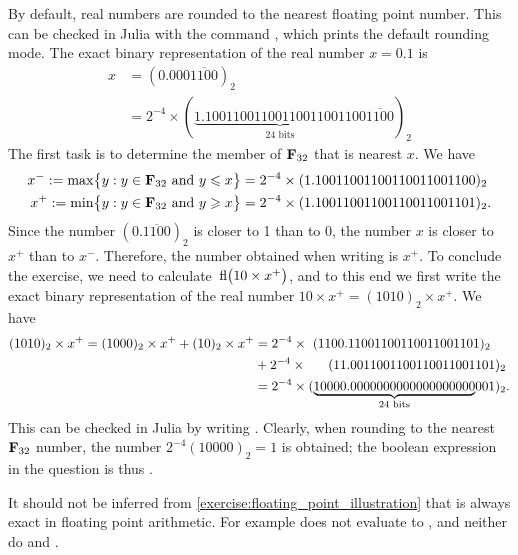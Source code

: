 \begin{solution}
    By default, real numbers are rounded to the nearest floating point number.
    This can be checked in Julia with the command ,
    which prints the default rounding mode.
    The exact binary representation of the real number $x = 0.1$ is
    \begin{align*}
        x
        &= (0.000\overline{1100})_2 \\
        &= 2^{-4} \times (\underbrace{1.10011001100110011001100}_{\text{24 bits}}\overline{1100})_2
    \end{align*}
    The first task is to determine the member of $\mathbf F_{32}$ that is nearest $x$.
    We have
    \begin{align*}
        x^- := \max \bigl\{y: y \in \mathbf F_{32} \text{ and } y \leqslant x\bigr\} &= 2^{-4} \times (1.10011001100110011001100)_2 \\
        x^+ := \min \bigl\{y: y \in \mathbf F_{32} \text{ and } y \geqslant x\bigr\} &= 2^{-4} \times (1.10011001100110011001101)_2.
    \end{align*}
    Since the number $(0.\overline{1100})_2$ is closer to 1 than to 0,
    the number $x$ is closer to $x^+$ than to $x^-$.
    Therefore, the number obtained when writing  is $x^+$.
    To conclude the exercise,
    we need to calculate~${\rm fl}\bigl(10 \times x^+\bigr)$,
    and to this end we first write the exact binary representation of the real number $10 \times x^+ = (1010)_2 \times x^+$.
    We have
    \begin{align*}
        (1010)_2 \times  x^+
        = (1000)_2 \times x^+ + (10)_2 \times x^+
        &= 2^{-4} \times ~ (1100.11001100110011001101)_2 \\
        & + 2^{-4} \times \hspace{.45cm}~(11.0011001100110011001101)_2 \\
        &= 2^{-4} \times (\underbrace{10000.0000000000000000000}_{\text{24 bits}}\!001)_2.
    \end{align*}
    This can be checked in Julia by writing .
    Clearly, when rounding to the nearest $\mathbf F_{32}$ number,
    the number $2^{-4} (10000)_2 = 1$ is obtained;
    the boolean expression in the question is thus .
\end{solution}

\begin{remark}
    It should not be inferred from \cref{exercise:floating_point_illustration} that  is always exact in floating point arithmetic.
    For example  does not evaluate to ,
    and neither do  and .
\end{remark}

